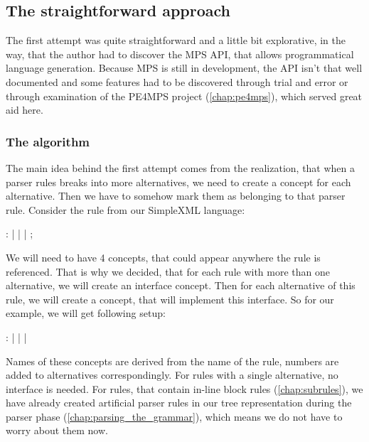 \subsection{The straightforward approach}
\label{chap:straightforward_approach}

The first attempt was quite straightforward and a little bit explorative, in the way, that the author had to discover the MPS API, that allows programmatical language generation.
Because MPS is still in development, the API isn't that well documented and some features had to be discovered through trial and error or through examination of the PE4MPS project (\ref{chap:pe4mps}), which served great aid here.

\subsubsection{The algorithm}
\label{chap:straight_algorithm}
The main idea behind the first attempt comes from the realization, that when a parser rules breaks into more alternatives, we need to create a concept for each alternative.
Then we have to somehow mark them as belonging to that parser rule.
Consider the  rule from our SimpleXML language:

\begin{antlr}
	    :   
           |   
           |   
           |   
           ;
\end{antlr}

We will need to have 4 concepts, that could appear anywhere the  rule is referenced.
That is why we decided, that for each rule with more than one alternative, we will create an interface concept.
Then for each alternative of this rule, we will create a concept, that will implement this interface.
So for our  example, we will get following setup:

\begin{antlr}
	   :   
           |   
           |   
           |   
\end{antlr}

Names of these concepts are derived from the name of the rule, numbers are added to alternatives correspondingly.
For rules with a single alternative, no interface is needed.
For rules, that contain in-line block rules (\ref{chap:subrules}), we have already created artificial parser rules in our tree representation during the parser phase (\ref{chap:parsing_the_grammar}), which means we do not have to worry about them now.
\\

